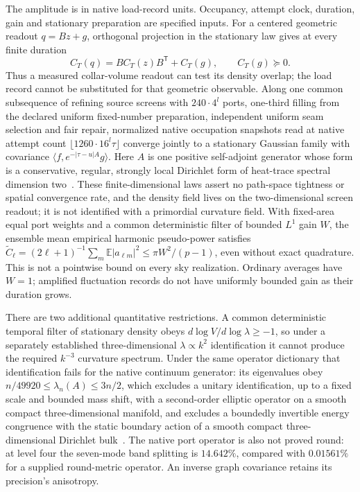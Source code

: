 The amplitude is in native load-record units. Occupancy, attempt clock,
duration, gain and stationary preparation are specified inputs.
For a centered geometric readout \(q=Bz+g\), orthogonal projection in
the stationary law gives at every finite duration
\[
 C_T(q)=B C_T(z)B^{\mathsf T}+C_T(g),\qquad C_T(g)\succeq0.
\]
Thus a measured collar-volume readout can test its density overlap;
the load record cannot be substituted for that geometric observable.
Along one common subsequence of refining source screens with
\(240\cdot4^l\) ports, one-third filling from the declared uniform
fixed-number preparation, independent uniform seam selection and fair
repair, normalized native occupation snapshots read at native attempt count
\(\lfloor1260\cdot16^l\tau\rfloor\) converge jointly to a stationary
Gaussian family with covariance \(\langle f,e^{-|\tau-u|A}g\rangle\). Here
\(A\) is one positive self-adjoint generator whose form is a conservative,
regular, strongly local Dirichlet form of heat-trace spectral dimension
two~\cite{ophcontinuum,ophtimefields}. These finite-dimensional laws assert
no path-space tightness or spatial convergence rate, and the density field
lives on the two-dimensional screen readout; it is not identified with a
primordial curvature field. With fixed-area
equal port weights and a common deterministic filter of bounded \(L^1\)
gain \(W\), the ensemble mean empirical harmonic pseudo-power satisfies
\(\widetilde C_\ell=(2\ell+1)^{-1}\sum_m\mathbb E|a_{\ell m}|^2
\le\pi W^2/(p-1)\), even without exact quadrature. This is not a
pointwise bound on every sky realization.
Ordinary averages have \(W=1\); amplified fluctuation records do not have
uniformly bounded gain as their duration grows.

There are two additional quantitative restrictions. A common deterministic
temporal filter of stationary density obeys
\(d\log V/d\log\lambda\ge-1\), so under a separately established
three-dimensional \(\lambda\propto k^2\) identification it cannot
produce the required \(k^{-3}\) curvature spectrum. Under the same operator
dictionary that identification fails for the native continuum generator:
its eigenvalues obey \(n/49920\le\lambda_n(A)\le3n/2\), which excludes a
unitary identification, up to a fixed scale and bounded mass shift, with a
second-order elliptic operator on a smooth compact three-dimensional
manifold, and excludes a boundedly invertible energy congruence with the
static boundary action of a smooth compact three-dimensional Dirichlet
bulk~\cite{ophcontinuum}. The native port
operator is also not proved round: at level four the seven-mode band
splitting is \(14.642\%\), compared with \(0.01561\%\) for a supplied
round-metric operator. An inverse graph covariance retains its precision's
anisotropy.

